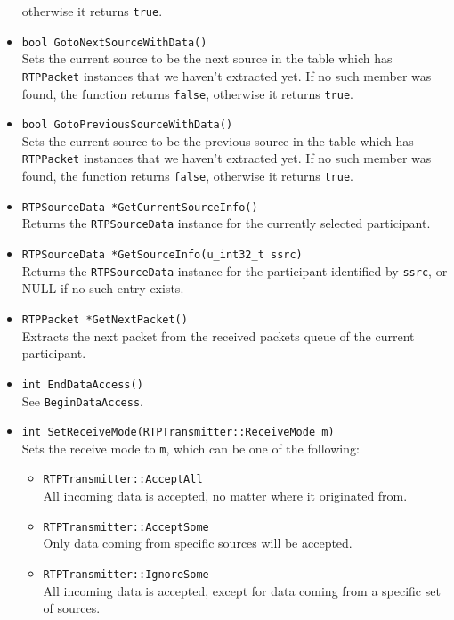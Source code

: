 \documentclass[12pt,a4paper]{article}
\begin{document}
\begin{itemize}
						otherwise it returns {\tt true}.
					\item {\tt bool GotoNextSourceWithData()}\\
						Sets the current source to be the next source in the table
						which has {\tt RTPPacket} instances that we haven't extracted
						yet. If no such member was found, the function returns {\tt false},
						otherwise it returns {\tt true}.
					\item {\tt bool GotoPreviousSourceWithData()}\\
						Sets the current source to be the previous source in the table
						which has {\tt RTPPacket} instances that we haven't extracted
						yet. If no such member was found, the function returns {\tt false},
						otherwise it returns {\tt true}.
					\item {\tt RTPSourceData *GetCurrentSourceInfo()}\\
						Returns the {\tt RTPSourceData} instance for the currently
						selected participant.
					\item {\tt RTPSourceData *GetSourceInfo(u\_int32\_t ssrc)}\\
						Returns the {\tt RTPSourceData} instance for the participant
						identified by {\tt ssrc}, or NULL if no such entry exists.
					\item {\tt RTPPacket *GetNextPacket()}\\
						Extracts the next packet from the received packets queue
						of the current participant.
					\item {\tt int EndDataAccess()}\\
						See {\tt BeginDataAccess}.
					\item {\tt int SetReceiveMode(RTPTransmitter::ReceiveMode m)}\\
						Sets the receive mode to {\tt m}, which can be one of the
						following:
						\begin{itemize}
							\item {\tt RTPTransmitter::AcceptAll}\\
								All incoming data is accepted, no matter where it originated
								from.
							\item {\tt RTPTransmitter::AcceptSome}\\
								Only data coming from specific sources will be accepted.
							\item {\tt RTPTransmitter::IgnoreSome}\\
								All incoming data is accepted, except for data coming from
								a specific set of sources.

\end{itemize}
\end{itemize}
\end{document}
